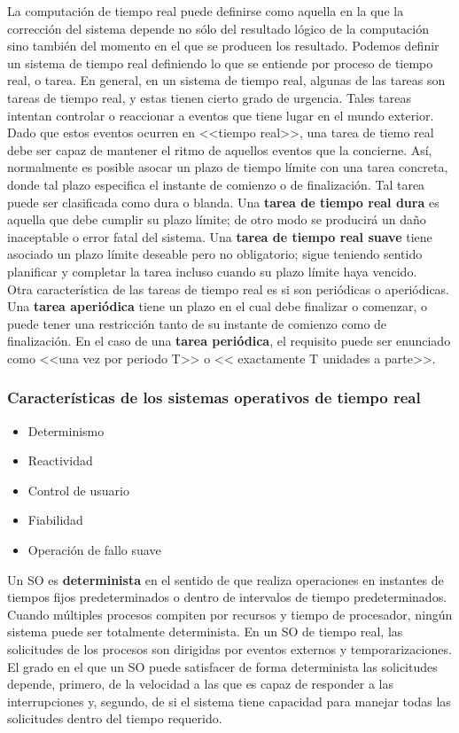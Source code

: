 \documentclass{article}
\begin{document}
				La computación de tiempo real puede definirse como aquella en la que la corrección del sistema depende no sólo del resultado lógico de la computación sino también del momento en el que se producen los resultado. Podemos definir un sistema de tiempo real definiendo lo que se entiende por proceso de tiempo real, o tarea. En general, en un sistema de tiempo real, algunas de las tareas son tareas de tiempo real, y estas tienen cierto grado de urgencia. Tales tareas intentan controlar o reaccionar a eventos que tiene lugar en el mundo exterior. Dado que estos eventos ocurren en <<tiempo real>>, una tarea de tiemo real debe ser capaz de mantener el ritmo de aquellos eventos que la concierne. Así, normalmente es posible asocar un plazo de tiempo límite con una tarea concreta, donde tal plazo especifica el instante de comienzo o de finalización. Tal tarea puede ser clasificada como dura o blanda. Una \textbf{tarea de tiempo real dura} es aquella que debe cumplir su plazo límite; de otro modo se producirá un daño inaceptable o error fatal del sistema. Una \textbf{tarea de tiempo real suave} tiene asociado un plazo límite deseable pero no obligatorio; sigue teniendo sentido planificar y completar la tarea incluso cuando su plazo límite haya vencido. \\
				
				Otra característica de las tareas de tiempo real es si son periódicas o aperiódicas. Una \textbf{tarea aperiódica} tiene un plazo en el cual debe finalizar o comenzar, o puede tener una restricción tanto de su instante de comienzo como de finalización. En el caso de una \textbf{tarea periódica}, el requisito puede ser enunciado como <<una vez por periodo T>> o << exactamente T unidades a parte>>.
				
			\subsubsection{Características de los sistemas operativos de tiempo real}
				\begin{itemize}
				\item Determinismo
				\item Reactividad
				\item Control de usuario
				\item Fiabilidad
				\item Operación de fallo suave
				\end{itemize}
				
				Un SO es \textbf{determinista} en el sentido de que realiza operaciones en instantes de tiempos fijos predeterminados o dentro de intervalos de tiempo predeterminados. Cuando múltiples procesos compiten por recursos y tiempo de procesador, ningún sistema puede ser totalmente determinista. En un SO de tiempo real, las solicitudes de los procesos son dirigidas por eventos externos y temporarizaciones. El grado en el que un SO puede satisfacer de forma determinista las solicitudes depende, primero, de la velocidad a las que es capaz de responder a las interrupciones y, segundo, de si el sistema tiene capacidad para manejar todas las solicitudes dentro del tiempo requerido. \\
				
\end{document}
